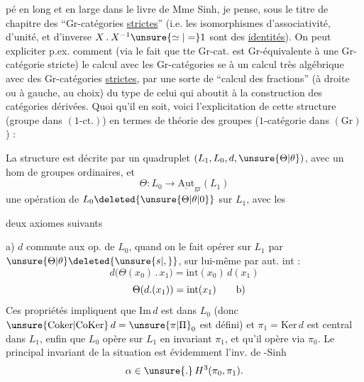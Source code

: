 %
pé en long et en large dans le livre de Mme Sinh, je pense, sous le titre de chapitre des ``Gr-catégories \uline{strictes}'' (i.e.  les isomorphismes d'associativité, d'unité, et d'inverse $X\mathbin{.}X^{-1}\unsure{\simeq|=}1$ sont des \uline{identités}). On peut expliciter p.ex. comment (via le fait que tte Gr-cat. est Gr-équivalente à une Gr-catégorie stricte) le calcul avec les Gr-catégories se  à un calcul très algébrique avec des Gr-catégories \uline{strictes}, par une sorte de ``calcul des fractions'' (à droite ou à gauche, au choix) du type de celui qui aboutit à la construction des catégories dérivées. Quoi qu'il en soit, voici l'explicitation de cette structure (groupe dans $(1\text{-ct.})$) en termes de théorie des groupes ($1$-catégorie dans $(\mathrm{Gr})$) :

La structure est décrite par un  quadruplet $(L_1,L_0,d,\unsure{\Theta|\theta})$, avec
un hom de groupes ordinaires, et
\[
\Theta:L_0\longrightarrow\underline{\mathrm{Aut}}_{\mathrm{gr}}(L_1)
\]
une opération de $L_0\deleted{\unsure{\Theta|\theta|0}}$ sur $L_1$, avec les

deux axiomes suivants

a) $d$ commute aux op. de $L_0$, quand on le fait opérer sur $L_1$ par $\unsure{\Theta|\theta}\deleted{\unsure{s|,}}$, sur lui-même par aut. int :
\[
d\bigl(\Theta(x_0)\mathbin{.}x_1\bigr)=\mathrm{int}(x_0)\,d(x_1)
\]
\[
\Theta(d.(x_1))=\mathrm{int}(x_1)\tag*{\makebox[0pt][r]{\makebox[\displaywidth][l]{b)}}}
\]
Ces propriétés impliquent que $\mathrm{Im}\,d$ est  dans $L_0$ (donc $\unsure{\mathrm{Coker}|\mathrm{CoKer}}\,d=\unsure{\pi|\Pi}_0$ est défini) et $\pi_1=\mathrm{Ker}\,d$ est central dans $L_1$, enfin que $L_0$ opère sur $L_1$ en invariant $\pi_1$, et qu'il opère via $\pi_0$. Le principal invariant  de la situation est évidemment l'inv. de -Sinh
\[
\alpha\in\unsure{.}\,H^3(\pi_0,\pi_1).
\]


